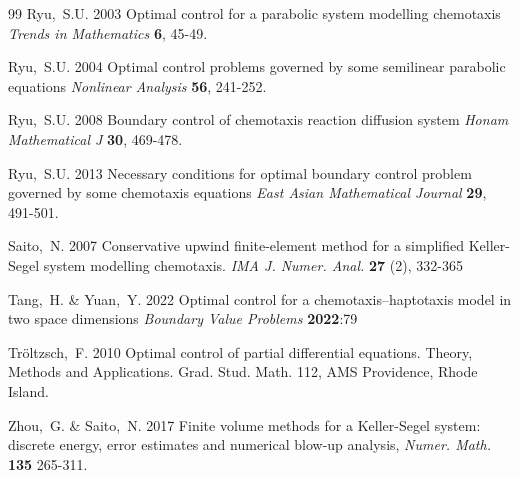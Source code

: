 \documentclass[11pt]{article}
\numberwithin{theorem}{section}
\begin{document}
\begin{thebibliography}{99}
  Ryu,~S.U.
2003   
Optimal control for a parabolic system modelling chemotaxis
\textit{Trends in Mathematics} \textbf{6}, 45-49. 


  Ryu,~S.U.
2004   
Optimal control problems governed by some semilinear parabolic equations
\textit{Nonlinear Analysis} \textbf{56}, 241-252. 

  Ryu,~S.U.
2008 
Boundary control of chemotaxis reaction diffusion system
\textit{Honam Mathematical J} \textbf{30}, 469-478. 

  Ryu,~S.U.
2013 
Necessary conditions for optimal boundary control problem governed by some chemotaxis equations
\textit{East Asian Mathematical Journal} \textbf{29}, 491-501. 

 Saito,~N. 
2007
Conservative upwind finite-element method for a simplified Keller-Segel system modelling chemotaxis. 
\textit{ IMA J. Numer. Anal.} \textbf{27} (2), 332-365

 Tang,~H. \& Yuan,~Y.
2022
Optimal control for a chemotaxis–haptotaxis model in two space dimensions
\textit{Boundary Value Problems} \textbf{2022}:79

 Tr\"oltzsch,~F. 2010
 Optimal control of partial differential equations. Theory, Methods and Applications. Grad. Stud. Math. 112, 
AMS Providence, Rhode Island.

Zhou,~G. \&  Saito,~N.  
2017
Finite volume methods for a Keller-Segel system: discrete energy, error estimates and numerical blow-up analysis, 
\textit{Numer. Math.} \textbf{135} 265-311.  




\end{thebibliography}
\end{document}

